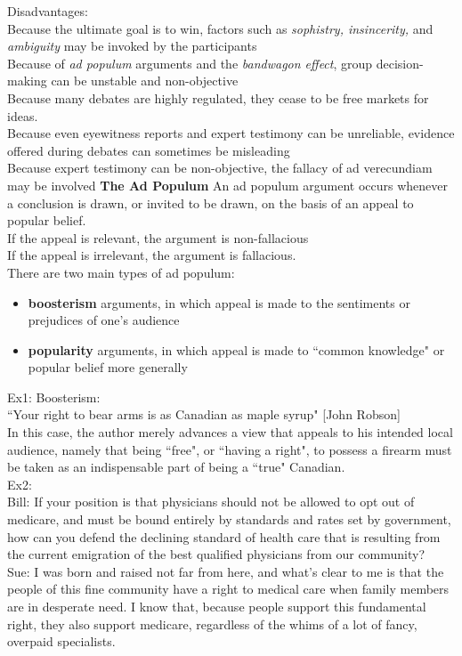 Disadvantages:\\
Because the ultimate goal is to win, factors such as \textit{sophistry, insincerity,} and \textit{ambiguity} may be invoked by the participants\\
Because of \textit{ad populum} arguments and the \textit{bandwagon effect}, group decision-making can be unstable and non-objective\\
Because many debates are highly regulated, they cease to be free markets for ideas.\\
Because even eyewitness reports and expert testimony can be unreliable, evidence offered during debates can sometimes be misleading\\
Because expert testimony can be non-objective, the fallacy of ad verecundiam may be involved
\textbf{The Ad Populum}
An ad populum argument occurs whenever a conclusion is drawn, or invited to be drawn, on the basis of an appeal to popular belief.\\
If the appeal is relevant, the argument is non-fallacious\\
If the appeal is irrelevant, the argument is fallacious.\\
There are two main types of ad populum:\\
\begin{itemize}
    \item \textbf{boosterism} arguments, in which appeal is made to the sentiments or prejudices of one's audience
    \item \textbf{popularity} arguments, in which appeal is made to ``common knowledge" or popular belief more generally
\end{itemize}
Ex1: Boosterism:\\
``Your right to bear arms is as Canadian as maple syrup" [John Robson]\\
In this case, the author merely advances a view that appeals to his intended local audience, namely that being ``free", or ``having a right", to possess a firearm must be taken as an indispensable part of being a ``true" Canadian.\\

Ex2:\\
Bill: If your position is that physicians should not be allowed to opt out of medicare, and must be bound entirely by standards and rates set by government, how can you defend the declining standard of health care that is resulting from the current emigration of the best qualified physicians from our community?\\
Sue: I was born and raised not far from here, and what's clear to me is that the people of this fine community have a right to medical care when family members are in desperate need. I know that, because people support this fundamental right, they also support medicare, regardless of the whims of a lot of fancy, overpaid specialists.\\

